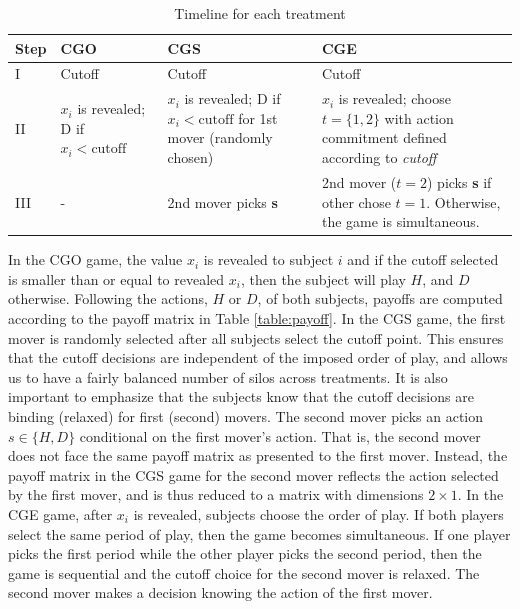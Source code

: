 \documentclass[12pt, letterpaper]{article}
\theoremstyle{plain}
\begin{document}
\begin{table}[ht]
\begin{center}

\caption{Timeline for each treatment}
\label{table:time}

\begin{tabular}{l|m{2.8cm}|m{3.5cm}|m{5cm}}
  Step & CGO & CGS & CGE\\
  \hline 
I & Cutoff & Cutoff & Cutoff \\
\hline
II& $x_i$ is revealed; D if $x_i< \text{cutoff}$ & $x_i$ is revealed; D if $x_i< \text{cutoff}$ for 1st mover (randomly chosen)
& $x_i$ is revealed; choose $t=\{1,2\}$ with action commitment defined according to \textit{cutoff}\\
\hline
III & - & 2nd mover picks \textbf{s} & 2nd mover ($t=2$) picks \textbf{s} if other chose $t=1$. Otherwise, the game is simultaneous.\\
\hline

\end{tabular}
\end{center}
\end{table}

In the CGO game, the value $x_i$ is revealed to subject $i$ and if the cutoff selected is smaller than or equal to revealed $x_i$, then the subject will play $H$, and $D$ otherwise. Following the actions, $H$ or $D$, of both subjects, payoffs are computed according to the payoff matrix in Table \ref{table:payoff}. In the CGS game, the first mover is randomly selected after all subjects select the cutoff point. This ensures that the cutoff decisions are independent of the imposed order of play, and allows us to have a fairly balanced number of silos across treatments. It is also important to emphasize that the subjects know that the cutoff decisions are binding (relaxed) for first (second) movers. The second mover picks an action $s\in\{H,D\}$ conditional on the first mover's action. That is, the second mover does not face the same payoff matrix as presented to the first mover. Instead, the payoff matrix in the CGS game for the second mover reflects the action selected by the first mover, and is thus reduced to a matrix with dimensions $2 \times 1$. In the CGE game, after $x_i$ is revealed, subjects choose the order of play. If both players select the same period of play, then the game becomes simultaneous. If one player picks the first period while the other player picks the second period, then the game is sequential and the cutoff choice for the second mover is relaxed. The second mover makes a decision knowing the action of the first mover. 
\end{document}

